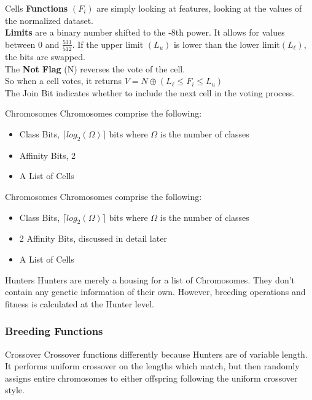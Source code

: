\documentclass{beamer}
\begin{document}
\begin{frame}{Cells}
	\textbf{Functions} \((F_i)\) are simply looking at features, looking at the values of the normalized dataset.  \\
	\textbf{Limits} are a binary number shifted to the -8th power.  It allows for values between 0 and \(\frac{511}{512}\).  If the upper limit \((L_u)\) is lower than the lower limit\((L_\ell)\), the bits are swapped.\\
	The \textbf{Not Flag} (N) reverses the vote of the cell. \\
	So when a cell votes, it returns \(V= N\oplus  (L_\ell \leq F_i \leq L_u)\)\\ 
	The Join Bit indicates whether to include the next cell in the voting process. 
\end{frame}
\begin{frame}{Chromosomes}
	Chromosomes comprise the following:
\begin{itemize}
	\item Class Bits, \(\lceil log_2(\Omega)\rceil\) bits where \(\Omega\) is the number of classes
	\item Affinity Bits, 2
	\item A List of Cells
\end{itemize}
\end{frame}

\begin{frame}{Chromosomes}
	Chromosomes comprise the following:
	\begin{itemize}
		\item Class Bits, \(\lceil log_2(\Omega)\rceil\) bits where \(\Omega\) is the number of classes
		\item 2 Affinity Bits, discussed in detail later
		\item A List of Cells
	\end{itemize}
\end{frame}

\begin{frame}{Hunters}
	Hunters are merely a housing for a list of Chromosomes.  They don't contain any genetic information of their own.  However, breeding operations and fitness is calculated at the Hunter level.
\end{frame}
\subsubsection{Breeding Functions}
\begin{frame}{Crossover}
	Crossover functions differently because Hunters are of variable length.  It performs uniform crossover on the lengths which match, but then randomly assigns entire chromosomes to either offspring following the uniform crossover style.
	 
\end{frame}
\end{document}
